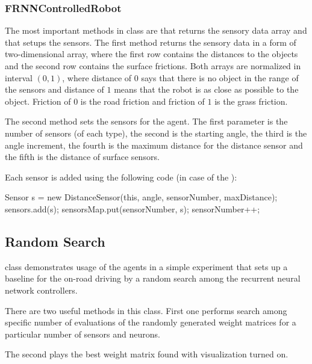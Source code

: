 \subsubsection{FRNNControlledRobot}

The most important methods in  class are 
 that returns the sensory data array and 
 that setups the sensors. The first method returns the sensory data in a form of two-dimensional array, where the first row contains the distances to the objects and the second row contains the surface frictions. Both arrays are normalized in interval $(0,1)$, where distance of $0$ says that there is no object in the range of the sensors and distance of $1$ means that the robot is as close as possible to the object. Friction of $0$ is the road friction and friction of $1$ is the grass friction.

The second method sets the sensors for the agent. The first parameter is the number of sensors (of each type), the second is the starting angle, the third is the angle increment, the fourth is the maximum distance for the distance sensor and the fifth is the distance of surface sensors.

Each sensor is added using the following code (in case of the ):
\begin{colorverbatim}
Sensor s = new DistanceSensor(this, angle, sensorNumber, maxDistance);
sensors.add(s);
sensorsMap.put(sensorNumber, s);
sensorNumber++;
\end{colorverbatim}


\subsection{Random Search}

 class demonstrates usage of the agents in a simple experiment that sets up a baseline for the on-road driving by a random search among the recurrent neural network controllers.

There are two useful methods in this class. First one  performs search among specific number of evaluations of the randomly generated weight matrices for a particular number of sensors and neurons.

The second  plays the best weight matrix found with visualization turned on.

